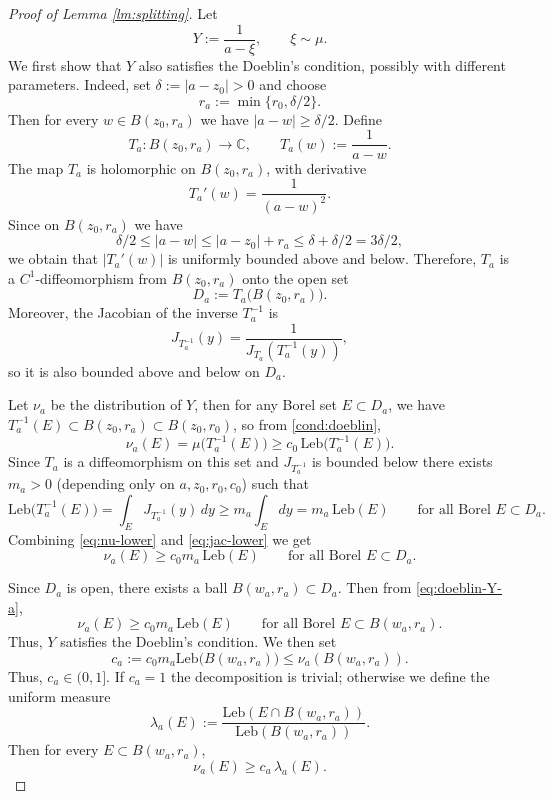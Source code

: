 \documentclass[12pt, reqno]{amsart}
\theoremstyle{plain}
\theoremstyle{definition}
\newcommand\C{{\mathbb{C}}}
\begin{document}
 \begin{proof} [Proof of Lemma \ref{lm:splitting}]
 	Let
 	\[
 	Y := \frac{1}{a - \xi}, \qquad \xi \sim \mu.
 	\]
 	We first show that $Y$ also satisfies the Doeblin's condition, possibly with different parameters. Indeed, set $\delta := |a - z_0|>0$ and choose
 	\[
 	r_a := \min\{r_0, \delta/2\}.
 	\]
 	Then for every $w \in B(z_0, r_a)$ we have $|a - w|\ge \delta/2.$
 	Define
 	\[
 	T_a : B(z_0, r_a) \to \C, \qquad T_a(w) := \frac{1}{a - w}.
 	\]
 	The map $T_a$ is holomorphic on $B(z_0, r_a)$, with derivative
 	\[
 	T_a'(w) = \frac{1}{(a-w)^2}.
 	\]
 	Since on $B(z_0,r_a)$ we have
 	\[
 	\delta/2 \le |a-w| \le |a - z_0| + r_a \le \delta + \delta/2 = 3\delta/2,
 	\]
 	we obtain that $ |T_a'(w)|$ is uniformly bounded above and below. Therefore, $T_a$ is a $C^1$-diffeomorphism from $B(z_0, r_a)$ onto the open set
 	\[
 	D_a := T_a\big(B(z_0, r_a)\big).
 	\]
 	Moreover, the Jacobian of the inverse $T_a^{-1}$ is
 	\[
 	J_{T_a^{-1}}(y) = \frac{1}{J_{T_a}(T_a^{-1}(y))},
 	\]
 	so it is also bounded above and below on $D_a$.
 	
 	\medskip
 	
 	Let $\nu_a$ be the distribution of $Y$, then for any Borel set $E \subset D_a$, we have $T_a^{-1}(E) \subset B(z_0, r_a) \subset B(z_0, r_0)$, so from \eqref{cond:doeblin},
 	\begin{equation}
 		\nu_a(E) = \mu\big(T_a^{-1}(E)\big) \ge c_0 \, \mathrm{Leb}\big(T_a^{-1}(E)\big).
 		\label{eq:nu-lower}	 		
 	\end{equation}
 	Since $T_a$ is a diffeomorphism on this set and $J_{T_a^{-1}}$ is bounded below there exists $m_a>0$ (depending only on $a, z_0, r_0, c_0$) such that
 	\begin{equation}
 		\mathrm{Leb}\big(T_a^{-1}(E)\big)
 		= \int_{E} J_{T_a^{-1}}(y)\, dy
 		\ge m_a \int_{E} dy
 		= m_a \, \mathrm{Leb}(E)
 		\qquad \text{for all Borel } E \subset D_a.
 		\label{eq:jac-lower}
 	\end{equation}
 	Combining \eqref{eq:nu-lower} and \eqref{eq:jac-lower} we get
 	\begin{equation}
 		\nu_a(E) \ge c_0 m_a \, \mathrm{Leb}(E)
 		\qquad \text{for all Borel } E \subset D_a.
 		\label{eq:doeblin-Y-a}
 	\end{equation}
 	
 	\medskip
 	
 	Since $D_a$ is open, there exists a ball $B(w_a, r_a) \subset D_a$.  
 	Then from \eqref{eq:doeblin-Y-a},
 	\[
 	\nu_a(E) \ge c_0 m_a \, \mathrm{Leb}(E)
 	\qquad \text{for all Borel } E \subset B(w_a, r_a).
 	\]
 	Thus, $Y$ satisfies the Doeblin's condition. We then set
 	\[
 	c_a := c_0 m_a \mathrm{Leb}\big(B(w_a, r_a)\big) \le \nu_a(B(w_a, r_a)).
 	\]
 	Thus, $c_a\in (0, 1]$.
 	If $c_a=1$ the decomposition is trivial; otherwise we define the uniform measure
 	\[
 	\lambda_a(E) := \frac{\mathrm{Leb}(E \cap B(w_a, r_a))}{\mathrm{Leb}(B(w_a, r_a))}.
 	\]
 	Then for every $E \subset B(w_a, r_a)$,
 	\begin{equation}
 		\nu_a(E) \ge c_a \, \lambda_a(E).
 	\end{equation}
 	

\end{proof}
\end{document}
